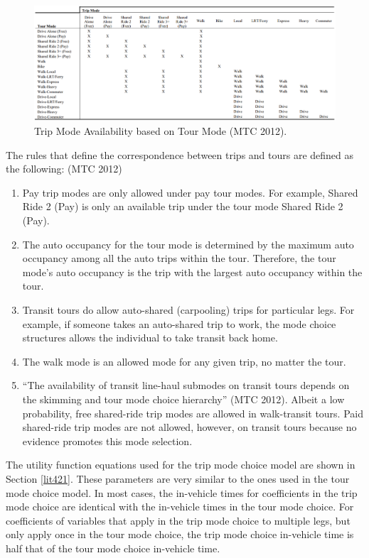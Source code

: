 \documentclass[12pt, oneside, openright]{byuthesis}
\begin{document}
\begin{figure}

{\centering \includegraphics[width=1\linewidth]{pics/trip_allow} 

}

\caption{Trip Mode Availability based on Tour Mode (MTC 2012).}\label{fig:fig2}
\end{figure}

The rules that define the correspondence between trips and tours are defined as the following: (MTC 2012)

\begin{enumerate}
\def\labelenumi{\arabic{enumi}.}
\item
  Pay trip modes are only allowed under pay tour modes. For example, Shared Ride 2 (Pay) is only an available trip under the tour mode Shared Ride 2 (Pay).
\item
  The auto occupancy for the tour mode is determined by the maximum auto occupancy among all the auto trips within the tour. Therefore, the tour mode's auto occupancy is the trip with the largest auto occupancy within the tour.
\item
  Transit tours do allow auto-shared (carpooling) trips for particular legs. For example, if someone takes an auto-shared trip to work, the mode choice structures allows the individual to take transit back home.
\item
  The walk mode is an allowed mode for any given trip, no matter the tour.
\item
  ``The availability of transit line-haul submodes on transit tours depends on the skimming and tour mode choice hierarchy'' (MTC 2012). Albeit a low probability, free shared-ride trip modes are allowed in walk-transit tours. Paid shared-ride trip modes are not allowed, however, on transit tours because no evidence promotes this mode selection.
\end{enumerate}

The utility function equations used for the trip mode choice model are shown in Section \ref{lit421}. These parameters are very similar to the ones used in the tour mode choice model. In most cases, the in-vehicle times for coefficients in the trip mode choice are identical with the in-vehicle times in the tour mode choice. For coefficients of variables that apply in the trip mode choice to multiple legs, but only apply once in the tour mode choice, the trip mode choice in-vehicle time is half that of the tour mode choice in-vehicle time.
\end{document}
